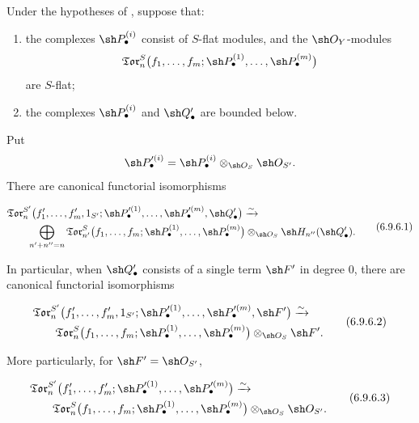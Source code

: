 \begin{corollary}[6.9.6]
\label{III.6.9.6}
Under the hypotheses of , suppose that:
\begin{enumerate}
  \item[$1^\circ$] the complexes $\sh P_\bullet^{(i)}$ consist of
  $S$-flat modules, and the $\sh O_Y$-modules
  \[
    \mathfrak{Tor}_n^S
    \bigl(
      f_1,\ldots,f_m;
      \sh P_\bullet^{(1)},\ldots,\sh P_\bullet^{(m)}
    \bigr)
  \]
  are $S$-flat;
  \item[$2^\circ$] the complexes $\sh P_\bullet^{(i)}$ and
  $\sh Q_\bullet'$ are bounded below.
\end{enumerate}


Put
\[
  \sh P_\bullet^{\prime(i)}
  =
  \sh P_\bullet^{(i)}
  \otimes_{\sh O_S}\sh O_{S'}.
\]
There are canonical functorial isomorphisms
\begin{env}[6.9.6.1]
\label{III.6.9.6.1}
\[
\begin{split}
  &
  \mathfrak{Tor}_n^{S'}
  \bigl(
    f_1',\ldots,f_m',1_{S'};
    \sh P_\bullet^{\prime(1)},\ldots,
    \sh P_\bullet^{\prime(m)},\sh Q_\bullet'
  \bigr)
  \xrightarrow{\sim}
  \\
  &\qquad
  \bigoplus_{n'+n''=n}
  \mathfrak{Tor}_{n'}^S
  \bigl(
    f_1,\ldots,f_m;
    \sh P_\bullet^{(1)},\ldots,\sh P_\bullet^{(m)}
  \bigr)
  \otimes_{\sh O_S}
  \sh H_{n''}(\sh Q_\bullet').
\end{split}
  \tag{6.9.6.1}\label{III.6.9.6.1.eq}
\]
\end{env}

In particular, when $\sh Q_\bullet'$ consists of a single term
$\sh F'$ in degree $0$, there are canonical functorial
isomorphisms
\begin{env}[6.9.6.2]
\label{III.6.9.6.2}
\[
\begin{split}
  &
  \mathfrak{Tor}_n^{S'}
  \bigl(
    f_1',\ldots,f_m',1_{S'};
    \sh P_\bullet^{\prime(1)},\ldots,
    \sh P_\bullet^{\prime(m)},\sh F'
  \bigr)
  \xrightarrow{\sim}
  \\
  &\qquad
  \mathfrak{Tor}_n^S
  \bigl(
    f_1,\ldots,f_m;
    \sh P_\bullet^{(1)},\ldots,\sh P_\bullet^{(m)}
  \bigr)
  \otimes_{\sh O_S}\sh F'.
\end{split}
  \tag{6.9.6.2}\label{III.6.9.6.2.eq}
\]
\end{env}
More particularly, for $\sh F'=\sh O_{S'}$,
\begin{env}[6.9.6.3]
\label{III.6.9.6.3}
\[
\begin{split}
  &
  \mathfrak{Tor}_n^{S'}
  \bigl(
    f_1',\ldots,f_m';
    \sh P_\bullet^{\prime(1)},\ldots,
    \sh P_\bullet^{\prime(m)}
  \bigr)
  \xrightarrow{\sim}
  \\
  &\qquad
  \mathfrak{Tor}_n^S
  \bigl(
    f_1,\ldots,f_m;
    \sh P_\bullet^{(1)},\ldots,\sh P_\bullet^{(m)}
  \bigr)
  \otimes_{\sh O_S}\sh O_{S'}.
\end{split}
  \tag{6.9.6.3}\label{III.6.9.6.3.eq}
\]
\end{env}
\end{corollary}

